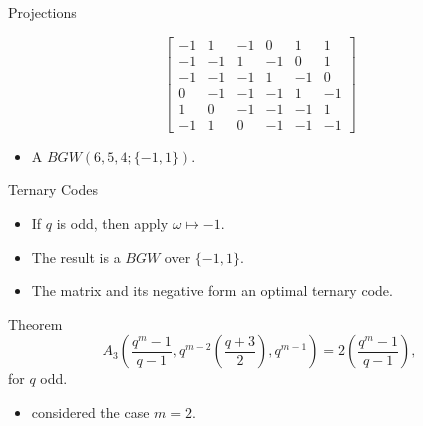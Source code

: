 \documentclass{beamer}
\newcommand{\M}{A}
\begin{document}
 \begin{frame}{Projections}
  
  \[
   \left[\begin{array}{cccccc}
-1 & 1 & -1 & 0 & 1 & 1 \\
-1 & -1 & 1 & -1 & 0 & 1 \\
-1 & -1 & -1 & 1 & -1 & 0 \\
0 & -1 & -1 & -1 & 1 & -1 \\
1 & 0 & -1 & -1 & -1 & 1 \\
-1 & 1 & 0 & -1 & -1 & -1
   \end{array}\right]
  \]

  \begin{itemize}
   \item\pause A $BGW(6,5,4; \{-1,1\})$.
  \end{itemize}

 \end{frame}

 
 \begin{frame}{Ternary Codes}
 
 \begin{itemize}
  \item If $q$ is odd, then apply $\omega \mapsto -1$.
  \item The result is a $BGW$ over $\{-1,1\}$.
  \item The matrix and its negative form an optimal ternary code.
 \end{itemize}
 
 \begin{block}{Theorem}
  $$
  \M_3\left( \frac{q^m-1}{q-1},q^{m-2}\left(\frac{q+3}{2}\right),q^{m-1} \right) = 2\left(\frac{q^m-1}{q-1}\right),
  $$
  for $q$ odd.
 \end{block}
  
  \begin{itemize}
   \item \cite{cont-tern-code} considered the case $m=2$.
  \end{itemize}

 \end{frame}
 
 
\end{document}
